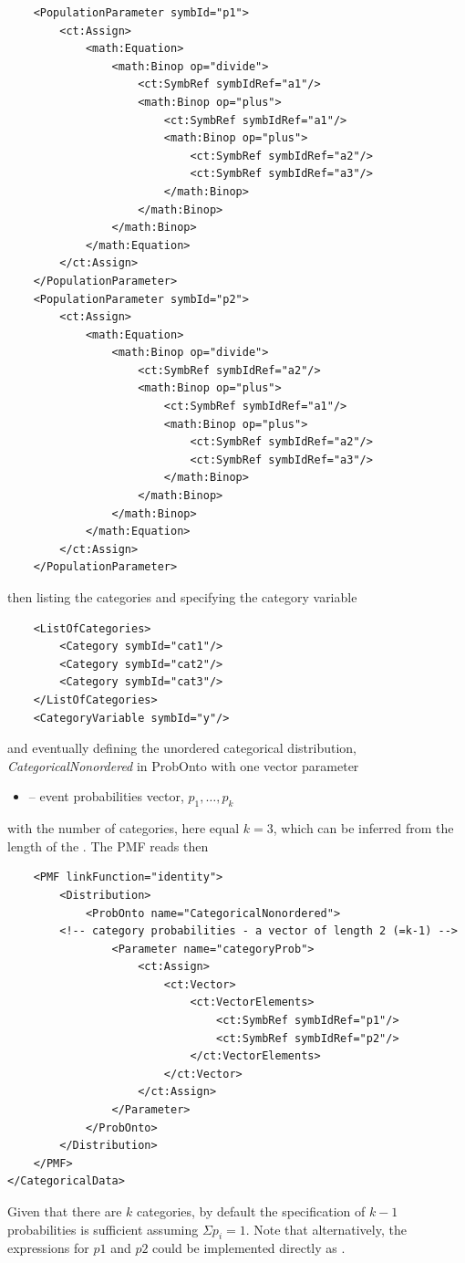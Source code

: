 {\begin{lstlisting}
    <PopulationParameter symbId="p1">
        <ct:Assign>
            <math:Equation>
                <math:Binop op="divide">
                    <ct:SymbRef symbIdRef="a1"/>
                    <math:Binop op="plus">
                        <ct:SymbRef symbIdRef="a1"/>
                        <math:Binop op="plus">
                            <ct:SymbRef symbIdRef="a2"/>
                            <ct:SymbRef symbIdRef="a3"/>
                        </math:Binop>
                    </math:Binop>
                </math:Binop>
            </math:Equation>
        </ct:Assign>
    </PopulationParameter>
    <PopulationParameter symbId="p2">
        <ct:Assign>
            <math:Equation>
                <math:Binop op="divide">
                    <ct:SymbRef symbIdRef="a2"/>
                    <math:Binop op="plus">
                        <ct:SymbRef symbIdRef="a1"/>
                        <math:Binop op="plus">
                            <ct:SymbRef symbIdRef="a2"/>
                            <ct:SymbRef symbIdRef="a3"/>
                        </math:Binop>
                    </math:Binop>
                </math:Binop>
            </math:Equation>
        </ct:Assign>
    </PopulationParameter>
\end{lstlisting}
then listing the categories and specifying the category variable
\lstset{language=XML}
\begin{lstlisting}
    <ListOfCategories> 
        <Category symbId="cat1"/>
        <Category symbId="cat2"/>
        <Category symbId="cat3"/>
    </ListOfCategories>                    
    <CategoryVariable symbId="y"/>
\end{lstlisting}
and eventually defining the unordered categorical distribution, \emph{CategoricalNonordered} 
in ProbOnto with one vector parameter
\begin{itemize}
\item 
{}  -- event probabilities vector, $p_1, \ldots, p_k$
\end{itemize}
with the number of categories, here equal $k\!=\!3$, which can be inferred from the length of the 
. The PMF reads then

\lstset{language=XML}
\begin{lstlisting}
    <PMF linkFunction="identity">
        <Distribution>
            <ProbOnto name="CategoricalNonordered">
		<!-- category probabilities - a vector of length 2 (=k-1) -->
                <Parameter name="categoryProb">
                    <ct:Assign>
                        <ct:Vector>
                            <ct:VectorElements>
                                <ct:SymbRef symbIdRef="p1"/>
                                <ct:SymbRef symbIdRef="p2"/>
                            </ct:VectorElements>
                        </ct:Vector>
                    </ct:Assign>
                </Parameter>
            </ProbOnto>
        </Distribution>
    </PMF>
</CategoricalData>
\end{lstlisting}
Given that there are $k$ categories, by default the specification of $k-1$ probabilities 
is sufficient assuming $\Sigma p_i = 1$. Note that alternatively, the expressions for 
$p1$ and $p2$ could be implemented directly as .

}
